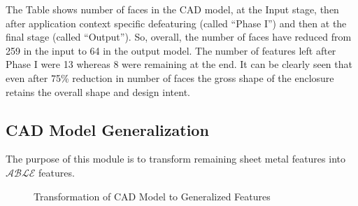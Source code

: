 
The Table shows number of faces in the CAD model, at the Input stage, then after application context specific defeaturing (called ``Phase I'') and then at the final stage (called ``Output''). So, overall, the number of faces have reduced from 259 in the input to 64 in the output model. The number of features left after Phase I were 13 whereas 8 were remaining at the end. It can be clearly seen that even after 75\% reduction in number of faces the gross shape of the enclosure retains the overall shape and design intent.

\subsection{CAD Model Generalization}

The purpose of this module is to transform remaining sheet metal features into $\mathcal{ABLE}$ features.


\begin{figure}[!h]
\centering     %
{}\quad
{}
\caption{Transformation of CAD Model to Generalized Features}\label{fig:results:enlosurepreable}
\end{figure}

